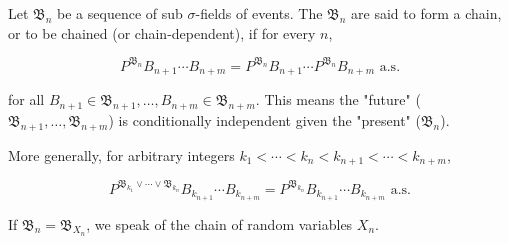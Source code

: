 Let $\mathfrak{B}_n$ be a sequence of sub $\sigma$-fields of events. The $\mathfrak{B}_n$ are said to form a chain, or to be chained (or chain-dependent), if for every $n$,

$$P^{\mathfrak{B}_n} B_{n+1} \cdots B_{n+m} = P^{\mathfrak{B}_n} B_{n+1} \cdots P^{\mathfrak{B}_n} B_{n+m} \text{ a.s.}$$

for all $B_{n+1} \in \mathfrak{B}_{n+1}, \ldots, B_{n+m} \in \mathfrak{B}_{n+m}$. This means the "future" ($\mathfrak{B}_{n+1}, \ldots, \mathfrak{B}_{n+m}$) is conditionally independent given the "present" ($\mathfrak{B}_n$).

More generally, for arbitrary integers $k_1 < \cdots < k_n < k_{n+1} < \cdots < k_{n+m}$,

$$P^{\mathfrak{B}_{k_1} \vee \cdots \vee \mathfrak{B}_{k_n}} B_{k_{n+1}} \cdots B_{k_{n+m}} = P^{\mathfrak{B}_{k_n}} B_{k_{n+1}} \cdots B_{k_{n+m}} \text{ a.s.}$$

If $\mathfrak{B}_n = \mathfrak{B}_{X_n}$, we speak of the chain of random variables $X_n$.
